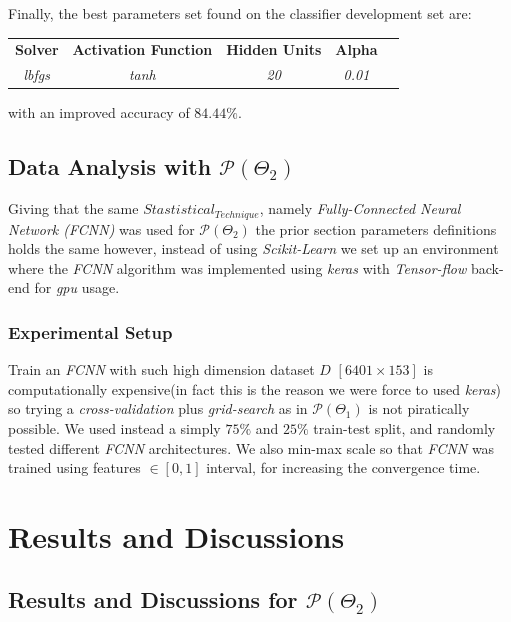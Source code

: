 Finally, the best parameters set found on the classifier development set are:
\begin{center}
    \begin{tabular}{ c c c c c }
    \textbf{Solver} & \textbf{Activation Function} & \textbf{Hidden Units}  &  \textbf{Alpha} \\
    \textit{lbfgs} & \textit{tanh} & \textit{20} & \textit{0.01} \\
    \end{tabular}
\end{center}
with an improved accuracy of $84.44\%$.

\subsection{Data Analysis with $\mathcal{P}(\Theta_{2})$}

Giving that the same $Stastistical_{Technique}$, namely \emph{Fully-Connected Neural Network (FCNN)} was used for  $\mathcal{P}(\Theta_{2})$ the prior section parameters definitions holds the same however, instead of using \emph{Scikit-Learn} we set up an environment where the \emph{FCNN} algorithm was implemented using \emph{keras} with \emph{Tensor-flow} back-end for \emph{gpu} usage.

\subsubsection{Experimental Setup}
Train an \emph{FCNN} with such high dimension dataset $D$ $[6401 \times 153]$ is computationally expensive(in fact this is the reason we were force to used \emph{keras}) so trying a \emph{cross-validation} plus  \emph{grid-search} as in   $\mathcal{P}(\Theta_{1})$ is not piratically possible. We used instead a simply $75\%$ and $25\%$ train-test split, and randomly tested different \emph{FCNN} architectures. We also min-max scale so that \emph{FCNN} was trained using features $\in [0,1]$ interval, for increasing the convergence time.



\section{Results and Discussions}

\subsection{Results and Discussions for  $\mathcal{P}(\Theta_{2})$}


